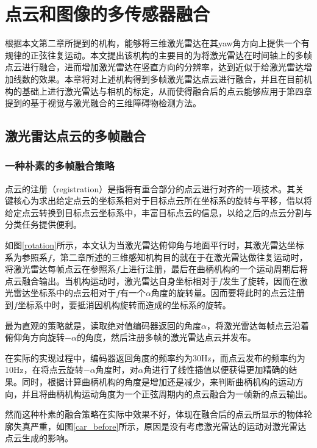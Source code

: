 

\chapter{点云和图像的多传感器融合}
根据本文第二章所提到的机构，能够将三维激光雷达在其yaw角方向上提供一个有规律的正弦往复运动。本文提出该机构的主要目的为将激光雷达在时间轴上的多帧点云进行融合，进而增加激光雷达在竖直方向的分辨率，达到近似于给激光雷达增加线数的效果。本章将对上述机构得到多帧激光雷达点云进行融合，并且在目前机构的基础上进行激光雷达与相机的标定，从而使得融合后的点云能够应用于第四章提到的基于视觉与激光融合的三维障碍物检测方法。

\section{激光雷达点云的多帧融合}

\subsection{一种朴素的多帧融合策略}
点云的注册（registration）是指将有重合部分的点云进行对齐的一项技术。其关键核心为求出给定点云的坐标系相对于目标点云所在坐标系的旋转与平移，借以将给定点云转换到目标点云坐标系中，丰富目标点云的信息，以给之后的点云分割与分类任务提供便利。


如图\ref{rotation}所示，本文认为当激光雷达俯仰角与地面平行时，其激光雷达坐标系为参照系$f$，第二章所述的三维感知机构目的就在于在激光雷达做往复运动时，将激光雷达每帧点云在参照系$f$上进行注册，最后在曲柄机构的一个运动周期后将点云融合输出。当机构运动时，激光雷达自身坐标相对于$f$发生了旋转，因而在激光雷达坐标系中的点云相对于$f$有一个$\alpha$角度的旋转量。因而要将此时的点云注册到$f$坐标系中时，要抵消因机构旋转而造成的坐标系的旋转。

最为直观的策略就是，读取绝对值编码器返回的角度$\alpha$，将激光雷达每帧点云沿着俯仰角方向旋转$-\alpha$的角度，然后注册多帧的激光雷达点云并发布。

在实际的实现过程中，编码器返回角度的频率约为30Hz，而点云发布的频率约为10Hz，在将点云旋转$-\alpha$角度时，对$\alpha$角进行了线性插值以便获得更加精确的结果。同时，根据计算曲柄机构的角度是增加还是减少，来判断曲柄机构的运动方向，并且将曲柄机构运动角度为一个正弦周期内的点云融合为一帧新的点云输出。

然而这种朴素的融合策略在实际中效果不好，体现在融合后的点云所显示的物体轮廓失真严重，如图\ref{car_before}所示，原因是没有考虑激光雷达的运动对激光雷达点云生成的影响。

